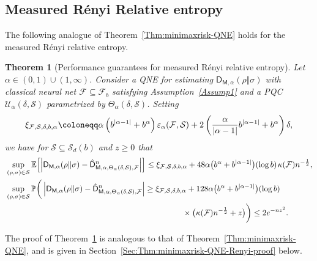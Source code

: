 \documentclass[a4paper,onecolumn,11pt,accepted=2026-05-12]{quantumarticle}
\newtheorem{theorem}{Theorem}
\newcommand{\abs}[1]{\left\vert#1\right\vert}
\newcommand{\sD}{\mathsf{D}}
\newcommand{\cF}{\mathcal{F}}
\newcommand{\cS}{\mathcal{S}}
\newcommand{\cU}{\mathcal{U}}
\newcommand{\EE}{\mathbb{E}}
\newcommand{\PP}{\mathbb{P}}
\begin{document}
\subsection{Measured R\'{e}nyi Relative  entropy} 
The following analogue of Theorem~\ref{Thm:minimaxrisk-QNE} holds for the measured R\'{e}nyi relative  entropy.

\begin{theorem}[Performance guarantees for measured R\'{e}nyi relative entropy] \label{Thm:minimaxrisk-QNE-Renyi}
Let $\alpha \in (0,1) \cup (1,\infty)$.  Consider a QNE for estimating $\sD_{\mathsf{M,\alpha}}(\rho\Vert\sigma)$ with classical neural net $\cF \subseteq \cF_b$ satisfying Assumption~\ref{Assump1} and a PQC $\cU_{\alpha}(\delta,\cS)$ parametrized by $\Theta_{\alpha}(\delta,\cS)$. Setting 
\begin{align}
 \xi_{\cF,\cS,\delta,b,\alpha} \coloneqq \alpha \left(b^{\abs{\alpha-1}}+b^{\alpha}\right) \varepsilon_{\alpha}(\cF,\cS) +2\left(\frac{\alpha}{\abs{\alpha-1}} b^{\abs{\alpha-1}}+b^{\alpha}\right)\delta, \notag 
\end{align}
we have for $\cS \subseteq \cS_d(b)$ and $z \geq 0$ that
\begin{align}
& \sup_{(\rho,\sigma) \in \cS}   \EE\!\left[ \abs{\sD_{\mathsf{M},\alpha}(\rho\Vert\sigma) -\hat{\sD}_{\mathsf{M},\alpha,\Theta_{\alpha}(\delta,\cS), \cF}^n}\right]  \leq  \xi_{\cF,\cS,\delta,b,\alpha}  + 48\alpha \big(b^{\alpha}+b^{\abs{\alpha-1}}\big)(\log  b) \mspace{2 mu}  \kappa(\cF) n^{-\frac 12},\label{eq:minimax risk:Renyi} \\
&  \sup_{(\rho,\sigma) \in \cS}   \PP\bigg( \abs{\sD_{\mathsf{M},\alpha}(\rho\Vert\sigma) -\hat{\sD}_{\mathsf{M},\alpha,\Theta_{\alpha}(\delta,\cS), \cF}^n} \geq  \xi_{\cF,\cS,\delta,b,\alpha}  + 128\alpha \big(b^{\alpha}+b^{\abs{\alpha-1}}\big)(\log  b) \mspace{2 mu} \notag \\
& \qquad \qquad  \qquad \qquad \qquad \qquad \qquad \qquad \qquad \qquad \qquad \times \big( \kappa(\cF) n^{-\frac 12}+z\big) \bigg) \leq 2 e^{-nz^2}. \label{eq:tailineqmeasrenyi}
\end{align}
\end{theorem}
The proof of Theorem~\ref{Thm:minimaxrisk-QNE-Renyi} is analogous to that of Theorem~\ref{Thm:minimaxrisk-QNE}, and is given in Section~\ref{Sec:Thm:minimaxrisk-QNE-Renyi-proof} below.

\medskip
\end{document}
